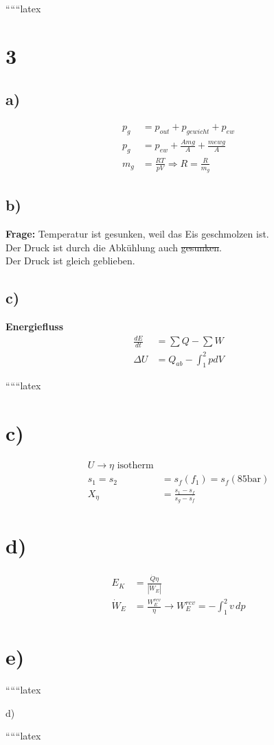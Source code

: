 
``````latex

\section*{3}

\subsection*{a)}
\begin{align*}
    p_g &= p_{out} + p_{gewicht} + p_{ew} \\
    p_g &= p_{ew} + \frac{A m g}{A} + \frac{m e w g}{A} \\
    m_g &= \frac{RT}{pV} \Rightarrow R = \frac{R}{m_g}
\end{align*}

\subsection*{b)}
\textbf{Frage:} Temperatur ist gesunken, weil das Eis geschmolzen ist. \\
Der Druck ist durch die Abkühlung auch \sout{gesunken}. \\
Der Druck ist gleich geblieben.

\subsection*{c)}
\textbf{Energiefluss}
\begin{align*}
    \frac{dE}{dt} &= \sum Q - \sum W \\
    \Delta U &= Q_{ab} - \int_{1}^{2} p dV
\end{align*}

``````latex

\section*{c)}
\begin{align*}
U \rightarrow \eta \text{ isotherm} \\
s_1 = s_2 &= s_f (f_1) = s_f (85 \text{bar}) \\
X_\eta &= \frac{s_1 - s_f}{s_g - s_f}
\end{align*}

\section*{d)}
\begin{align*}
E_K &= \frac{\dot{Q} \eta}{\left| \dot{W}_E \right|} \\
\dot{W}_E &= \frac{W_E^{rev}}{\eta} \rightarrow W_E^{rev} = - \int_{1}^{2} v \, dp
\end{align*}

\section*{e)}
``````latex


d)

``````latex


